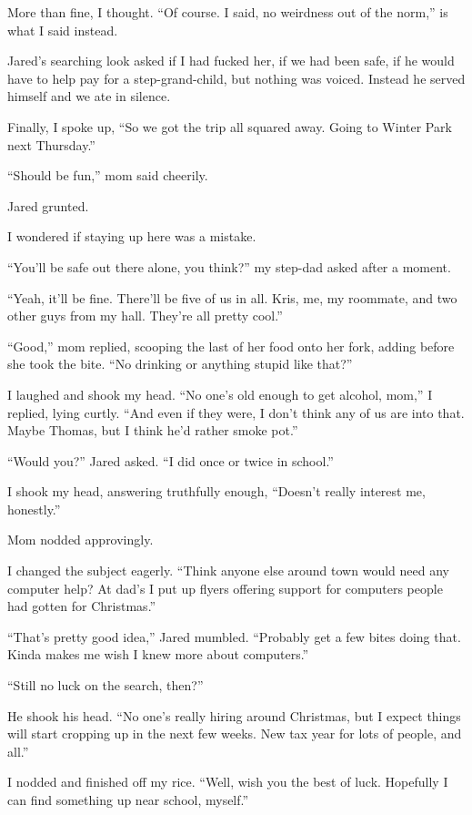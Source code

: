 More than fine, I thought.  ``Of course.  I said, no weirdness out of the norm,'' is what I said instead.

Jared's searching look asked if I had fucked her, if we had been safe, if he would have to help pay for a step-grand-child, but nothing was voiced.  Instead he served himself and we ate in silence.

Finally, I spoke up, ``So we got the trip all squared away.  Going to Winter Park next Thursday.''

``Should be fun,'' mom said cheerily.

Jared grunted.

I wondered if staying up here was a mistake.

``You'll be safe out there alone, you think?'' my step-dad asked after a moment.

``Yeah, it'll be fine.  There'll be five of us in all.  Kris, me, my roommate, and two other guys from my hall.  They're all pretty cool.''

``Good,'' mom replied, scooping the last of her food onto her fork, adding before she took the bite.  ``No drinking or anything stupid like that?''

I laughed and shook my head.  ``No one's old enough to get alcohol, mom,'' I replied, lying curtly.  ``And even if they were, I don't think any of us are into that.  Maybe Thomas, but I think he'd rather smoke pot.''

``Would you?'' Jared asked.  ``I did once or twice in school.''

I shook my head, answering truthfully enough, ``Doesn't really interest me, honestly.''

Mom nodded approvingly.

I changed the subject eagerly.  ``Think anyone else around town would need any computer help?  At dad's I put up flyers offering support for computers people had gotten for Christmas.''

``That's pretty good idea,'' Jared mumbled.  ``Probably get a few bites doing that.  Kinda makes me wish I knew more about computers.''

``Still no luck on the search, then?''

He shook his head.  ``No one's really hiring around Christmas, but I expect things will start cropping up in the next few weeks.  New tax year for lots of people, and all.''

I nodded and finished off my rice.  ``Well, wish you the best of luck.  Hopefully I can find something up near school, myself.''

